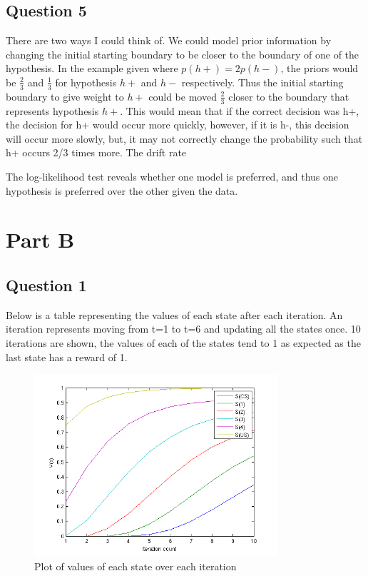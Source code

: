 \documentclass[11pt, twocolumn]{report}
\begin{document}
\section{Question 5}
There are two ways I could think of. We could model prior information by changing the initial starting boundary to be closer to the boundary of one of the hypothesis. In the example given where $p(h+) = 2p(h-)$, the priors would be $\frac{2}{3}$ and $\frac{1}{3}$ for hypothesis $h+$ and $h-$ respectively. Thus the initial starting boundary to give weight to $h+$ could be moved $\frac{2}{3}$ closer to  the boundary that represents hypothesis $h+$. This would mean that if the correct decision was h+, the decision for h+ would occur more quickly, however, if it is h-, this decision will occur more slowly, but, it may not correctly change the probability such that h+ occurs 2/3 times more. The drift rate 

The log-likelihood test reveals whether one model is preferred, and thus one hypothesis is preferred over the other given the data. 

\chapter{Part B}

\section{Question 1}
Below is a table representing the values of each state after each iteration. An iteration represents moving from t=1 to t=6 and updating all the states once. 10 iterations are shown, the values of each of the states tend to 1 as expected as the last state has a reward of 1. 

\begin{figure}[H]
\centering
\includegraphics[width=90mm]{assignment2_images/part2_a.png}
\caption{Plot of values of each state over each iteration}
\label{values}
\end{figure}
\end{document}
